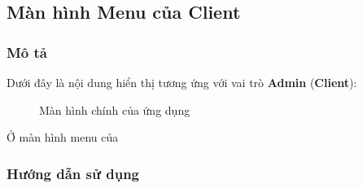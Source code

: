\subsection{Màn hình Menu của Client}
\subsubsection{Mô tả}
Dưới đây là nội dung hiển thị tương ứng với vai trò \textbf{Admin} (\textbf{Client}):
\begin{figure}[H]
	\caption{Màn hình chính của ứng dụng}
	\label{fig:ClientMenuWindow}
\end{figure}
Ở màn hình menu của 
\subsubsection{Hướng dẫn sử dụng}
